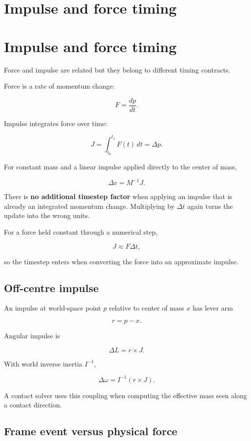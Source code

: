 \hypertarget{appendix-c39931e6e4c2}{}
\section*{Impulse and force timing}
\section{Impulse and force timing}\label{impulse-and-force-timing}

Force and impulse are related but they belong to different timing contracts.

Force is a rate of momentum change:

\[
F=\frac{dp}{dt}.
\]

Impulse integrates force over time:

\[
J=\int_{t_0}^{t_1}F(t)\,dt
=
\Delta p.
\]

For constant mass and a linear impulse applied directly to the center of mass,

\[
\Delta v=M^{-1}J.
\]

There is \textbf{no additional timestep factor} when applying an impulse that is already an integrated momentum change. Multiplying by \(\Delta t\) again turns the update into the wrong units.

For a force held constant through a numerical step,

\[
J\approx F\Delta t,
\]

so the timestep enters when converting the force into an approximate impulse.

\subsection{Off-centre impulse}\label{off-centre-impulse}

An impulse at world-space point \(p\) relative to center of mass \(x\) has lever arm

\[
r=p-x.
\]

Angular impulse is

\[
\Delta L=r\times J.
\]

With world inverse inertia \(I^{-1}\),

\[
\Delta\omega=I^{-1}(r\times J).
\]

A contact solver uses this coupling when computing the effective mass seen along a contact direction.

\subsection{Frame event versus physical force}\label{frame-event-versus-physical-force}

